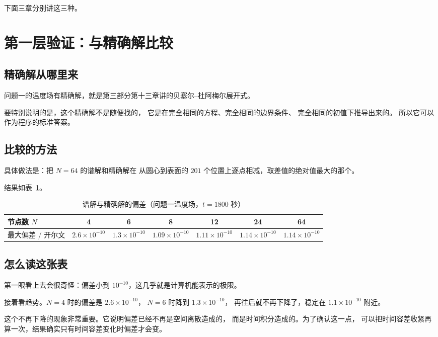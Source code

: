 下面三章分别讲这三种。

\section{第一层验证：与精确解比较}

\subsection{精确解从哪里来}

问题一的温度场有精确解，就是第三部分第十三章讲的贝塞尔--杜阿梅尔展开式。

要特别说明的是，这个精确解不是随便找的，
它是在完全相同的方程、完全相同的边界条件、
完全相同的初值下推导出来的。
所以它可以作为程序的标准答案。

\subsection{比较的方法}

具体做法是：把 $N=64$ 的谱解和精确解在
从圆心到表面的 $201$ 个位置上逐点相减，取差值的绝对值最大的那个。

结果如表~\ref{tab:verify1}。

\begin{table}[H]
\centering
\small
\caption{谱解与精确解的偏差（问题一温度场，$t=1800$ 秒）}
\label{tab:verify1}
\begin{tabular}{@{}lcccccc@{}}
\toprule
节点数 $N$ & 4 & 6 & 8 & 12 & 24 & 64 \\
\midrule
最大偏差 / 开尔文 & $2.6\times10^{-10}$ & $1.3\times10^{-10}$ & $1.09\times10^{-10}$
& $1.11\times10^{-10}$ & $1.14\times10^{-10}$ & $1.14\times10^{-10}$ \\
\bottomrule
\end{tabular}
\end{table}

\subsection{怎么读这张表}

第一眼看上去会很奇怪：偏差小到 $10^{-10}$，这几乎就是计算机能表示的极限。

接着看趋势。$N=4$ 时的偏差是 $2.6\times10^{-10}$，
$N=6$ 时降到 $1.3\times10^{-10}$，
再往后就不再下降了，稳定在 $1.1\times10^{-10}$ 附近。

这个不再下降的现象非常重要。它说明偏差已经不再是空间离散造成的，
而是时间积分造成的。为了确认这一点，
可以把时间容差收紧再算一次，结果确实只有时间容差变化时偏差才会变。

